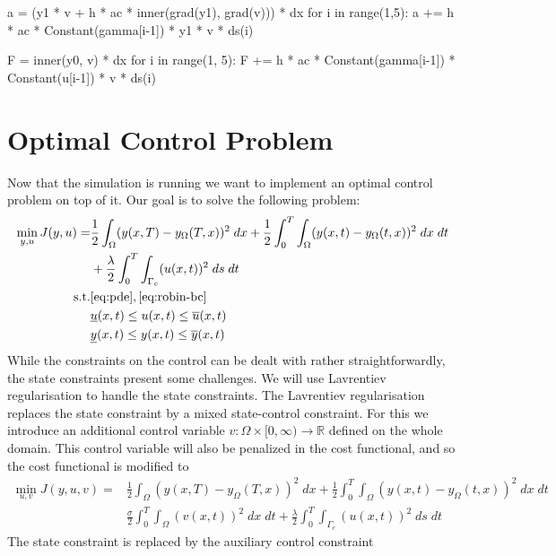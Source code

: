 \documentclass[
12pt, %
a4paper, %
onecolumn, %
portrait %
]{article}
\begin{document}
\begin{python}
a = (y1 * v + h * ac * inner(grad(y1), grad(v))) * dx
for i in range(1,5):
    a += h * ac * Constant(gamma[i-1]) * y1 * v * ds(i)
\end{python}


\begin{python}
F = inner(y0, v) * dx
for i in range(1, 5):
    F += h * ac * Constant(gamma[i-1]) * Constant(u[i-1]) * v * ds(i)
\end{python}

\section{Optimal Control Problem}
Now that the simulation is running we want to implement an optimal control problem on top of it. Our goal is to solve the following problem:
\begin{align*}
\min_{y,u} J(y, u) = & \frac{1}{2}\int_{\Omega} (y(x, T) - y_{\Omega}(T,x))^2 \; dx + \frac{1}{2} \int_{0}^{T} \int_{\Omega} (y(x,t) - y_{\Omega}(t,x))^2 \; dx \; dt \\
& + \frac{\lambda}{2} \int_{0}^{T} \int_{\Gamma_c} (u(x,t))^2 \; ds \; dt \\
\text{s.t.} & \eqref{eq:pde}, \eqref{eq:robin-bc} \\
& \underline{u}(x,t) \leq u(x,t) \leq \overline{u}(x,t) \\
& \underline{y}(x,t) \leq y(x,t) \leq \overline{y}(x,t)
\end{align*}
While the constraints on the control can be dealt with rather straightforwardly, the state constraints present some challenges. We will use Lavrentiev regularisation to handle the state constraints. The Lavrentiev regularisation replaces the state constraint by a mixed state-control constraint. For this we introduce an additional control variable $v : \Omega \times [0, \infty) \rightarrow \mathbb{R}$ defined on the whole domain. This control variable will also be penalized in the cost functional, and so the cost functional is modified to
\begin{align*}
\min_{u,v} J(y, u, v) = & \frac{1}{2}\int_{\Omega} (y(x, T) - y_{\Omega}(T,x))^2 \; dx + \frac{1}{2} \int_{0}^{T} \int_{\Omega} (y(x,t) - y_{\Omega}(t,x))^2 \; dx \; dt \\
& \frac{\sigma}{2} \int_{0}^{T} \int_{\Omega} (v(x,t))^2 \; dx \; dt 
+ \frac{\lambda}{2} \int_{0}^{T} \int_{\Gamma_c} (u(x,t))^2 \; ds \; dt
\end{align*}
The state constraint is replaced by the auxiliary control constraint
\end{document}
